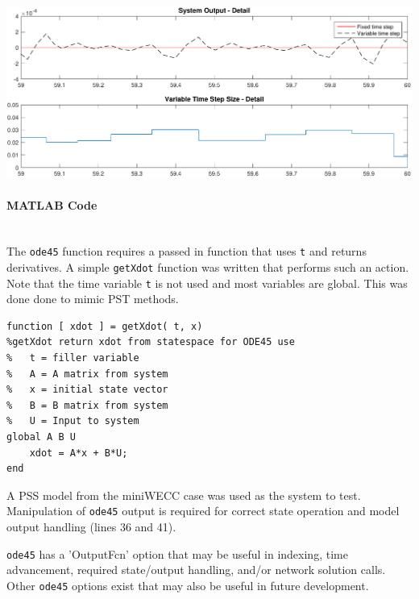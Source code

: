 \documentclass[12pt]{article}
\begin{document}
\includegraphics[width=\linewidth]{stepDetail2}


\paragraph{MATLAB Code} \ \\
The \verb|ode45| function requires a passed in function that uses \verb|t| and returns derivatives.
A simple \verb|getXdot| function was written that performs such an action.
Note that the time variable \verb|t| is not used and most variables are global.
This was done done to mimic PST methods.
\begin{verbatim}
function [ xdot ] = getXdot( t, x)
%getXdot return xdot from statespace for ODE45 use
%   t = filler variable
%   A = A matrix from system
%   x = initial state vector
%   B = B matrix from system
%   U = Input to system
global A B U
    xdot = A*x + B*U;
end		
\end{verbatim}
A PSS model from the miniWECC case was used as the system to test.
Manipulation of \verb|ode45| output is required for correct state operation and model output handling (lines 36 and 41).

\verb|ode45| has a 'OutputFcn' option that may be useful in indexing, time advancement, required state/output handling, and/or network solution calls.
Other \verb|ode45| options exist that may also be useful in future development.
\end{document}
